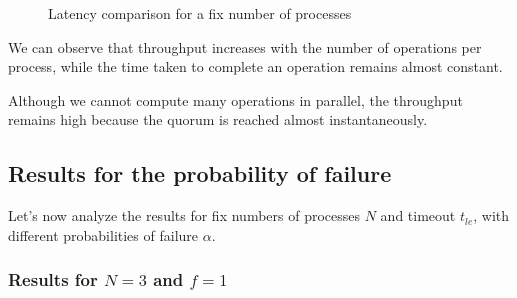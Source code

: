 \begin{figure}[ht!]
    \centering
    \caption{Latency comparison for a fix number of processes}
\end{figure}

We can observe that throughput increases with the number of operations
per process, while the time taken to complete an operation remains almost constant.

Although we cannot compute many operations in parallel, the throughput
remains high because the quorum is reached almost instantaneously.

\newpage

\subsection{Results for the probability of failure}
Let's now analyze the results for fix numbers of processes $N$ and timeout $t_{le}$, with different probabilities of failure $\alpha$.

\subsubsection{Results for \(N = 3\) and \(f = 1\)}

